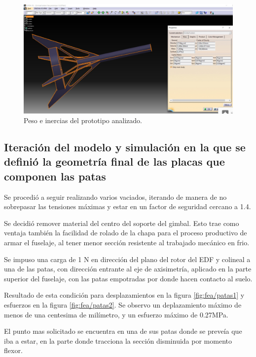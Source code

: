 \begin{figure}[htb]
    \centering
    \includegraphics[height=0.27\pdfpageheight]{fig/fea/inercias}
    \caption{Peso e inercias del prototipo analizado.}
    \label{fig:fea/tuboplacainercias}
\end{figure}

\null\newpage
\clearpage

\subsection{Iteración del modelo y simulación en la que se definió la geometría final de las placas que componen las patas}


Se procedió a seguir realizando varios vaciados, iterando de manera de no sobrepasar las tensiones máximas y estar en un factor de seguridad cercano a 1.4.

Se decidió remover material del centro del soporte del gimbal. Esto trae como ventaja también la facilidad de rolado de la chapa para el proceso productivo de armar el fuselaje, al tener menor sección resistente al trabajado mecánico en frio.

Se impuso una carga de 1 N en dirección del plano del rotor del EDF y colineal a una de las patas, con dirección entrante al eje de axisimetría, aplicado en la parte superior del fuselaje, con las patas empotradas por donde hacen contacto al suelo.

Resultado de esta condición para desplazamientos en la figura \ref{fig:fea/patas1} y esfuerzos en la figura \ref{fig:fea/patas2}. Se observo un deplazamiento máximo de menos de una centesima de milímetro, y un esfuerzo máximo de 0.27MPa.

El punto mas solicitado se encuentra en una de sus patas donde se preveía que iba a estar, en la parte donde tracciona la sección disminuida por momento flexor.

